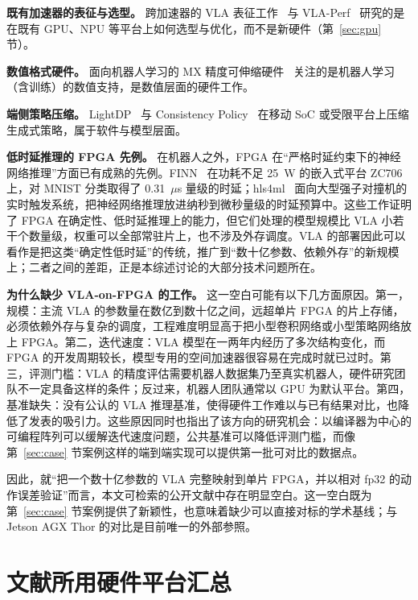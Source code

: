 \documentclass[a4paper,10.5pt]{ctexart}
\begin{document}
\textbf{既有加速器的表征与选型。} 跨加速器的 VLA 表征工作~\cite{xpuvla} 与 VLA-Perf~\cite{vlaperf} 研究的是在既有 GPU、NPU 等平台上如何选型与优化，而不是新硬件（第~\ref{sec:gpu} 节）。

\textbf{数值格式硬件。} 面向机器人学习的 MX 精度可伸缩硬件~\cite{mxrobot} 关注的是机器人学习（含训练）的数值支持，是数值层面的硬件工作。

\textbf{端侧策略压缩。} LightDP~\cite{lightdp} 与 Consistency Policy~\cite{consistencypolicy} 在移动 SoC 或受限平台上压缩生成式策略，属于软件与模型层面。

\textbf{低时延推理的 FPGA 先例。} 在机器人之外，FPGA 在“严格时延约束下的神经网络推理”方面已有成熟的先例。FINN~\cite{finn} 在功耗不足 25~W 的嵌入式平台 ZC706 上，对 MNIST 分类取得了 0.31~$\mu$s 量级的时延；hls4ml~\cite{hls4ml} 面向大型强子对撞机的实时触发系统，把神经网络推理放进纳秒到微秒量级的时延预算中。这些工作证明了 FPGA 在确定性、低时延推理上的能力，但它们处理的模型规模比 VLA 小若干个数量级，权重可以全部常驻片上，也不涉及外存调度。VLA 的部署因此可以看作是把这类“确定性低时延”的传统，推广到“数十亿参数、依赖外存”的新规模上；二者之间的差距，正是本综述讨论的大部分技术问题所在。

\textbf{为什么缺少 VLA-on-FPGA 的工作。} 这一空白可能有以下几方面原因。第一，规模：主流 VLA 的参数量在数亿到数十亿之间，远超单片 FPGA 的片上存储，必须依赖外存与复杂的调度，工程难度明显高于把小型卷积网络或小型策略网络放上 FPGA。第二，迭代速度：VLA 模型在一两年内经历了多次结构变化，而 FPGA 的开发周期较长，模型专用的空间加速器很容易在完成时就已过时。第三，评测门槛：VLA 的精度评估需要机器人数据集乃至真实机器人，硬件研究团队不一定具备这样的条件；反过来，机器人团队通常以 GPU 为默认平台。第四，基准缺失：没有公认的 VLA 推理基准，使得硬件工作难以与已有结果对比，也降低了发表的吸引力。这些原因同时也指出了该方向的研究机会：以编译器为中心的可编程阵列可以缓解迭代速度问题，公共基准可以降低评测门槛，而像第~\ref{sec:case} 节案例这样的端到端实现可以提供第一批可对比的数据点。

因此，就“把一个数十亿参数的 VLA 完整映射到单片 FPGA，并以相对 fp32 的动作误差验证”而言，本文可检索的公开文献中存在明显空白。这一空白既为第~\ref{sec:case} 节案例提供了新颖性，也意味着缺少可以直接对标的学术基线；与 Jetson AGX Thor 的对比是目前唯一的外部参照。


\section{文献所用硬件平台汇总}\label{sec:platforms}
\end{document}
